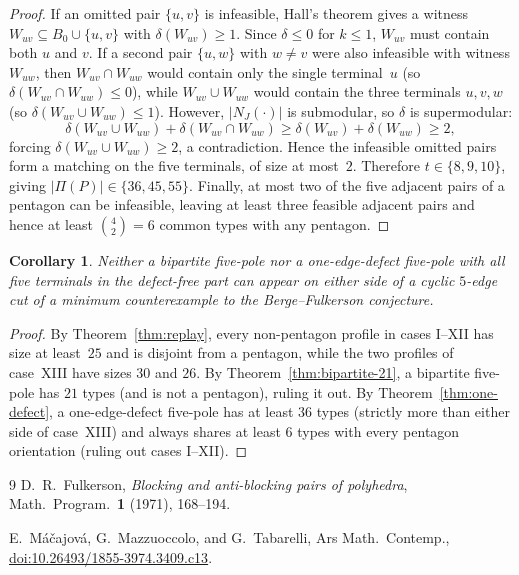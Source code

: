 \documentclass[11pt]{article}
\newtheorem{corollary}[theorem]{Corollary}
\theoremstyle{remark}
\begin{document}
\begin{proof}
If an omitted pair $\{u, v\}$ is infeasible, Hall's theorem gives a witness
$W_{uv} \subseteq B_0 \cup \{u, v\}$ with $\delta(W_{uv}) \ge 1$. Since $\delta \le 0$
for $k \le 1$, $W_{uv}$ must contain both $u$ and $v$. If a second pair $\{u, w\}$ with
$w \neq v$ were also infeasible with witness $W_{uw}$, then $W_{uv} \cap W_{uw}$ would
contain only the single terminal~$u$ (so $\delta(W_{uv} \cap W_{uw}) \le 0$), while
$W_{uv} \cup W_{uw}$ would contain the three terminals $u, v, w$ (so
$\delta(W_{uv} \cup W_{uw}) \le 1$). However, $|N_J(\cdot)|$ is submodular, so $\delta$
is supermodular:
\[
  \delta(W_{uv} \cup W_{uw}) + \delta(W_{uv} \cap W_{uw})
  \ge \delta(W_{uv}) + \delta(W_{uw}) \ge 2,
\]
forcing $\delta(W_{uv} \cup W_{uw}) \ge 2$, a contradiction. Hence the infeasible
omitted pairs form a matching on the five terminals, of size at most~$2$. Therefore
$t \in \{8, 9, 10\}$, giving $|\Pi(P)| \in \{36, 45, 55\}$. Finally, at most two of the
five adjacent pairs of a pentagon can be infeasible, leaving at least three feasible
adjacent pairs and hence at least $\binom{4}{2} = 6$ common types with any pentagon.
\end{proof}

\begin{corollary}
Neither a bipartite five-pole nor a one-edge-defect five-pole with all five terminals in
the defect-free part can appear on either side of a cyclic $5$-edge cut of a minimum
counterexample to the Berge--Fulkerson conjecture.
\end{corollary}

\begin{proof}
By Theorem~\ref{thm:replay}, every non-pentagon profile in cases I--XII has size at
least~$25$ and is disjoint from a pentagon, while the two profiles of case~XIII have
sizes $30$ and $26$. By Theorem~\ref{thm:bipartite-21}, a bipartite five-pole has $21$
types (and is not a pentagon), ruling it out. By Theorem~\ref{thm:one-defect}, a
one-edge-defect five-pole has at least $36$ types (strictly more than either side of
case~XIII) and always shares at least $6$ types with every pentagon orientation (ruling
out cases I--XII).
\end{proof}

\begin{thebibliography}{9}
D.~R.~Fulkerson,
\emph{Blocking and anti-blocking pairs of polyhedra},
Math.\ Program.\ \textbf{1} (1971), 168--194.

E.~M\'{a}\v{c}ajov\'{a}, G.~Mazzuoccolo, and G.~Tabarelli,
Ars Math.\ Contemp., \href{https://doi.org/10.26493/1855-3974.3409.c13}{doi:10.26493/1855-3974.3409.c13}.
\end{thebibliography}
\end{document}
